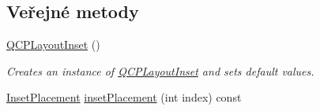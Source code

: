 \subsection*{Veřejné metody}
\begin{DoxyCompactItemize}
\item 
\hypertarget{classQCPLayoutInset_a3ad984f3221735374cc5dee14356a7dd}{}\hyperlink{classQCPLayoutInset_a3ad984f3221735374cc5dee14356a7dd}{Q\+C\+P\+Layout\+Inset} ()\label{classQCPLayoutInset_a3ad984f3221735374cc5dee14356a7dd}

\begin{DoxyCompactList}\small\item\em Creates an instance of \hyperlink{classQCPLayoutInset}{Q\+C\+P\+Layout\+Inset} and sets default values. \end{DoxyCompactList}\item 
\hypertarget{classQCPLayoutInset_a8472ff2508807513e4cb0ce0c1d652b3}{}\hyperlink{classQCPLayoutInset_a8b9e17d9a2768293d2a7d72f5e298192}{Inset\+Placement} \hyperlink{classQCPLayoutInset_a8472ff2508807513e4cb0ce0c1d652b3}{inset\+Placement} (int index) const \label{classQCPLayoutInset_a8472ff2508807513e4cb0ce0c1d652b3}


\end{DoxyCompactItemize}
